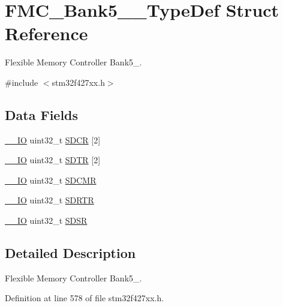 \hypertarget{struct_f_m_c___bank5__6___type_def}{}\section{F\+M\+C\+\_\+\+Bank5\+\_\+\_\+\+Type\+Def Struct Reference}
\label{struct_f_m_c___bank5__6___type_def}


Flexible Memory Controller Bank5\+\_.  




{\ttfamily \#include $<$stm32f427xx.\+h$>$}

\subsection*{Data Fields}
\begin{DoxyCompactItemize}
\item 
\hyperlink{core__sc300_8h_aec43007d9998a0a0e01faede4133d6be}{\+\_\+\+\_\+\+IO} uint32\+\_\+t \hyperlink{struct_f_m_c___bank5__6___type_def_ae9c0ece98f21a3b60aeb74b80fd96375}{S\+D\+CR} \mbox{[}2\mbox{]}
\item 
\hyperlink{core__sc300_8h_aec43007d9998a0a0e01faede4133d6be}{\+\_\+\+\_\+\+IO} uint32\+\_\+t \hyperlink{struct_f_m_c___bank5__6___type_def_a1270b172aa29c22a793ebc5e203108d7}{S\+D\+TR} \mbox{[}2\mbox{]}
\item 
\hyperlink{core__sc300_8h_aec43007d9998a0a0e01faede4133d6be}{\+\_\+\+\_\+\+IO} uint32\+\_\+t \hyperlink{struct_f_m_c___bank5__6___type_def_a6722a71defead0b07cca1b79fab0fe88}{S\+D\+C\+MR}
\item 
\hyperlink{core__sc300_8h_aec43007d9998a0a0e01faede4133d6be}{\+\_\+\+\_\+\+IO} uint32\+\_\+t \hyperlink{struct_f_m_c___bank5__6___type_def_aed6d294188e6135964d6c3431c741fda}{S\+D\+R\+TR}
\item 
\hyperlink{core__sc300_8h_aec43007d9998a0a0e01faede4133d6be}{\+\_\+\+\_\+\+IO} uint32\+\_\+t \hyperlink{struct_f_m_c___bank5__6___type_def_ac36dc12c736f19eb2bc33fd6ab4c02de}{S\+D\+SR}
\end{DoxyCompactItemize}


\subsection{Detailed Description}
Flexible Memory Controller Bank5\+\_. 

Definition at line 578 of file stm32f427xx.\+h.



